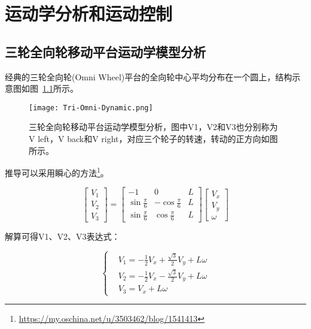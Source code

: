 \chapter{运动学分析和运动控制}
\label{cha:Movement}

\section{三轮全向轮移动平台运动学模型分析}


经典的三轮全向轮(Omni Wheel)平台的全向轮中心平均分布在一个圆上，结构示意图如图~\ref{fig:Tri-Omni-Dynamic}所示。

\begin{figure}[htbp]
    \centering
    \texttt{[image: Tri-Omni-Dynamic.png]}
    \caption{三轮全向轮移动平台运动学模型分析，图中V1，V2和V3也分别称为V left，V back和V right，对应三个轮子的转速，转动的正方向如图所示。}
    \label{fig:Tri-Omni-Dynamic}
\end{figure}

推导可以采用瞬心的方法\footnote{\url{https://my.oschina.net/u/3503462/blog/1541413}}。

\begin{equation}
    \left[\begin{array}{l}
    {V_{1}} \\
    {V_{2}} \\
    {V_{3}}
    \end{array}\right]=\left[\begin{array}{ccc}
    {-1} & {0} & {L} \\
    {\sin \frac{\pi}{6}} & {-\cos \frac{\pi}{6}} & {L} \\
    {\sin \frac{\pi}{6}} & {\cos \frac{\pi}{6}} & {L}
    \end{array}\right]\left[\begin{array}{l}
    {V_{x}} \\
    {V_{y}} \\
    {\omega}
    \end{array}\right]
\end{equation}

解算可得V1、V2、V3表达式：

\begin{equation}
    \left\{\begin{aligned}
    &V_{1}=-\frac{1}{2} V_{x}+\frac{\sqrt{3}}{2} V_{y}+L \omega \\
    &V_{2}=-\frac{1}{2} V_{x}-\frac{\sqrt{3}}{2} V_{y}+L \omega \\
    &V_{3}=V_{x}+L \omega
    \end{aligned}\right.
\end{equation}

